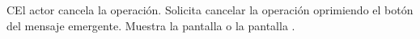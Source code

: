 \begin{UCtrayectoriaA}{C}{El actor cancela la operación.}
	\UCpaso[\UCactor] Solicita cancelar la operación oprimiendo el botón  del mensaje emergente.
	\UCpaso[\UCsist] Muestra la pantalla  o la pantalla .
\end{UCtrayectoriaA}
  
